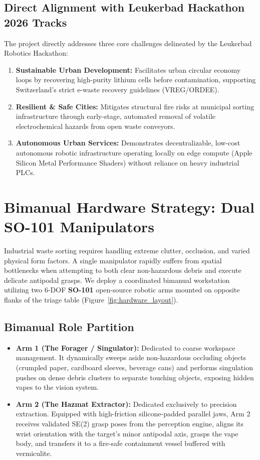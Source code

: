 \documentclass[10pt,a4paper]{article}
\begin{document}
\subsection{Direct Alignment with Leukerbad Hackathon 2026 Tracks}
The project directly addresses three core challenges delineated by the Leukerbad Robotics Hackathon:
\begin{enumerate}
    \item \textbf{Sustainable Urban Development:} Facilitates urban circular economy loops by recovering high-purity lithium cells before contamination, supporting Switzerland's strict e-waste recovery guidelines (VREG/ORDEE).
    \item \textbf{Resilient \& Safe Cities:} Mitigates structural fire risks at municipal sorting infrastructure through early-stage, automated removal of volatile electrochemical hazards from open waste conveyors.
    \item \textbf{Autonomous Urban Services:} Demonstrates decentralizable, low-cost autonomous robotic infrastructure operating locally on edge compute (Apple Silicon Metal Performance Shaders) without reliance on heavy industrial PLCs.
\end{enumerate}

\section{Bimanual Hardware Strategy: Dual SO-101 Manipulators}

Industrial waste sorting requires handling extreme clutter, occlusion, and varied physical form factors. A single manipulator rapidly suffers from spatial bottlenecks when attempting to both clear non-hazardous debris and execute delicate antipodal grasps. We deploy a coordinated bimanual workstation utilizing two 6-DOF \textbf{SO-101} open-source robotic arms mounted on opposite flanks of the triage table (Figure~\ref{fig:hardware_layout}).

\subsection{Bimanual Role Partition}
\begin{itemize}
    \item \textbf{Arm 1 (The Forager / Singulator):} Dedicated to coarse workspace management. It dynamically sweeps aside non-hazardous occluding objects (crumpled paper, cardboard sleeves, beverage cans) and performs singulation pushes on dense debris clusters to separate touching objects, exposing hidden vapes to the vision system.
    \item \textbf{Arm 2 (The Hazmat Extractor):} Dedicated exclusively to precision extraction. Equipped with high-friction silicone-padded parallel jaws, Arm 2 receives validated SE(2) grasp poses from the perception engine, aligns its wrist orientation with the target's minor antipodal axis, grasps the vape body, and transfers it to a fire-safe containment vessel buffered with vermiculite.
\end{itemize}
\end{document}
